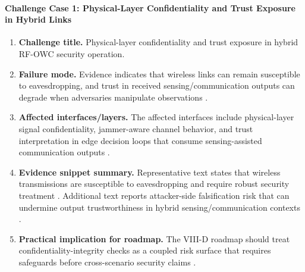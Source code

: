 \paragraph{Challenge Case 1: Physical-Layer Confidentiality and Trust Exposure in Hybrid Links}
\begin{enumerate}
    \item \textbf{Challenge title.} Physical-layer confidentiality and trust exposure in hybrid RF-OWC security operation.
    \item \textbf{Failure mode.} Evidence indicates that wireless links can remain susceptible to eavesdropping, and trust in received sensing/communication outputs can degrade when adversaries manipulate observations \cite{O_ISAC_145}.
    \item \textbf{Affected interfaces/layers.} The affected interfaces include physical-layer signal confidentiality, jammer-aware channel behavior, and trust interpretation in edge decision loops that consume sensing-assisted communication outputs \cite{O_ISAC_145}.
    \item \textbf{Evidence snippet summary.} Representative text states that wireless transmissions are susceptible to eavesdropping and require robust security treatment \cite{O_ISAC_145}. Additional text reports attacker-side falsification risk that can undermine output trustworthiness in hybrid sensing/communication contexts \cite{O_ISAC_145}.
    \item \textbf{Practical implication for roadmap.} The VIII-D roadmap should treat confidentiality-integrity checks as a coupled risk surface that requires safeguards before cross-scenario security claims \cite{O_ISAC_145}.
\end{enumerate}

